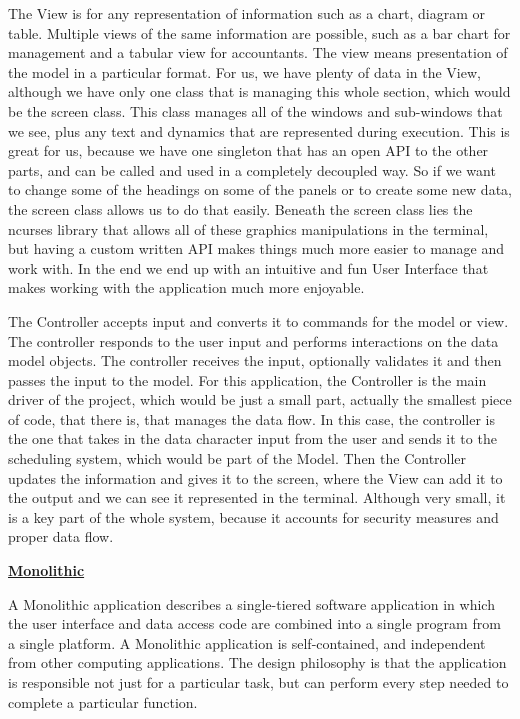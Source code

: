 \documentclass{article}
\begin{document}
The View is for any representation of information such as a chart, diagram or table. Multiple views of the same information are possible, such as a bar chart for management and a tabular view for accountants. The view means presentation of the model in a particular format. For us, we have plenty of data in the View, although we have only one class that is managing this whole section, which would be the screen class. This class manages all of the windows and sub-windows that we see, plus any text and dynamics that are represented during execution. This is great for us, because we have one singleton that has an open API to the other parts, and can be called and used in a completely decoupled way. So if we want to change some of the headings on some of the panels or to create some new data, the screen class allows us to do that easily. Beneath the screen class lies the ncurses library that allows all of these graphics manipulations in the terminal, but having a custom written API makes things much more easier to manage and work with. In the end we end up with an intuitive and fun User Interface that makes working with the application much more enjoyable.

The Controller accepts input and converts it to commands for the model or view. The controller responds to the user input and performs interactions on the data model objects. The controller receives the input, optionally validates it and then passes the input to the model. For this application, the Controller is the main driver of the project, which would be just a small part, actually the smallest piece of code, that there is, that manages the data flow. In this case, the controller is the one that takes in the data character input from the user and sends it to the scheduling system, which would be part of the Model. Then the Controller updates the information and gives it to the screen, where the View can add it to the output and we can see it represented in the terminal. Although very small, it is a key part of the whole system, because it accounts for security measures and proper data flow.

\bigskip

\textbf{\underline{Monolithic}}

A Monolithic application describes a single-tiered software application in which the user interface and data access code are combined into a single program from a single platform. A Monolithic application is self-contained, and independent from other computing applications. The design philosophy is that the application is responsible not just for a particular task, but can perform every step needed to complete a particular function.
\end{document}

